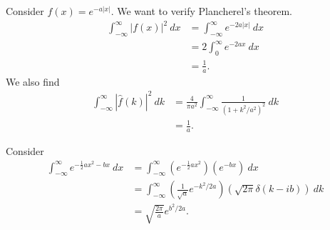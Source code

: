 \documentclass[10pt]{mypackage}
\begin{document}
\begin{example}
  Consider $f(x) = e^{-a|x|}$. We want to verify Plancherel's theorem.
  \begin{align*}
    \int_{-\infty}^{\infty} \left\vert f(x) \right\vert^2\:dx &= \int_{-\infty}^{\infty} e^{-2a|x|}\:dx\\
                                                              &= 2 \int_{0}^{\infty} e^{-2ax}\:dx\\
                                                              &= \frac{1}{a}.
  \end{align*}
  We also find
  \begin{align*}
    \int_{-\infty}^{\infty} \left\vert \widehat{f}(k) \right\vert^2\:dk &= \frac{4}{\pi a^2}\int_{-\infty}^{\infty} \frac{1}{\left(1 + k^2/a^2\right)^2}\:dk\\
                                                                        &= \frac{1}{a}.
  \end{align*}
\end{example}
\begin{example}
  Consider
  \begin{align*}
    \int_{-\infty}^{\infty} e^{-\frac{1}{2}ax^2 - bx}\:dx &= \int_{-\infty}^{\infty} \left(e^{-\frac{1}{2}ax^2}\right)\left(e^{-bx}\right)\:dx\\
                                                          &= \int_{-\infty}^{\infty} \left(\frac{1}{\sqrt{a}}e^{-k^2/2a}\right)\left(\sqrt{2\pi}\delta\left(k-ib\right)\right)\:dk\\
                                                          &= \sqrt{\frac{2\pi}{a}}e^{b^2/2a}.
  \end{align*}
\end{example}
\end{document}
